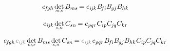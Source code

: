 \[
e_{\hspace{-0.25ex}f\hspace{-0.2ex}gh} \hspace{.33ex} \determinantby{m}{s} \, \somematrixelements{ms} \hspace{-0.2ex}
= e_{i\hspace{-0.1ex}j\hspace{-0.1ex}k} \hspace{.1ex} \somematrixelements{\hspace{-0.25ex}f\hspace{-0.1ex}i} \somematrixelements{\hspace{-0.1ex}gj} \somematrixelements{hk}
\hspace{-0.2ex}
\]

\[
e_{i\hspace{-0.1ex}j\hspace{-0.1ex}k} \hspace{.33ex} \determinantby{s}{\hspace{.1ex}n} \, C_{sn} \hspace{-0.2ex}
= e_{pqr} \hspace{.1ex} C_{ip} C_{\hspace{-0.1ex}j\hspace{-0.1ex}q} C_{kr}
\hspace{-0.2ex}
\]

\[
e_{\hspace{-0.25ex}f\hspace{-0.2ex}gh} \hspace{.2ex} \mathcolor{black!50}{e_{i\hspace{-0.1ex}j\hspace{-0.1ex}k}} \hspace{.33ex} \determinantby{m}{s} \, \somematrixelements{ms} \hspace{.33ex} \determinantby{s}{\hspace{.1ex}n} \, C_{sn} \hspace{-0.2ex}
= \mathcolor{black!50}{e_{i\hspace{-0.1ex}j\hspace{-0.1ex}k}} \hspace{.2ex} e_{pqr} \hspace{.1ex} \somematrixelements{\hspace{-0.25ex}f\hspace{-0.1ex}i} \somematrixelements{\hspace{-0.1ex}gj} \somematrixelements{hk} \hspace{.1ex} C_{ip} C_{\hspace{-0.1ex}j\hspace{-0.1ex}q} C_{kr}
\hspace{-0.2ex}
\]

